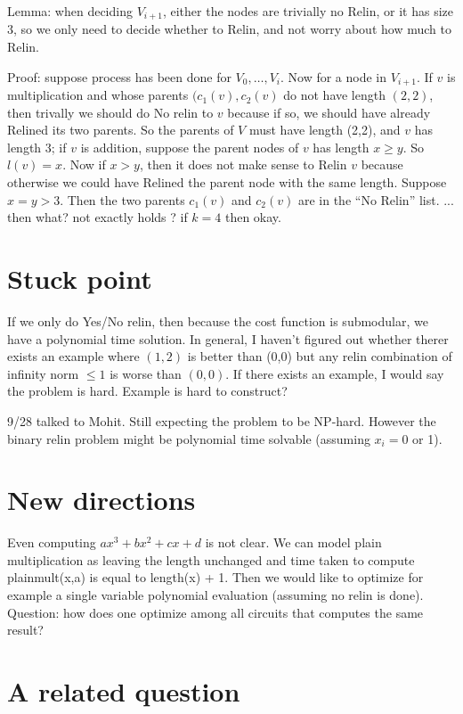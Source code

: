 \documentclass[11pt]{article} %
\theoremstyle{plain}
\theoremstyle{definition}
\begin{document}
Lemma: when deciding $V_{i+1}$, either the nodes are trivially no Relin, or it has size 3, so we only need
to decide whether to Relin, and not worry about how much to Relin.

Proof: suppose process has been done for $V_0, \ldots, V_i$. Now for a node in $V_{i+1}$. If $v$ is 
multiplication and whose parents $(c_1(v), c_2(v)$ do not have length $(2,2)$, then trivally we should do No relin to $v$ because if so, we 
should have already Relined its two parents.  So the parents of $V$ must have length (2,2), and $v$ has 
length 3; if $v$ is addition, suppose the parent nodes of $v$ has length $x \geq y$.  So $l(v) = x$.  Now if 
$x > y$, then it does not make sense to Relin $v$ because otherwise we could have Relined the parent node with the same length. Suppose $x = y > 3$. Then the two parents $c_1(v)$ and $c_2(v)$  are in the 
``No Relin'' list. ... then what? not exactly holds ?  if $k = 4$ then okay. 

\section{Stuck point}

If we only do Yes/No relin, then because the cost function is submodular, we have a polynomial time solution. In general, I haven't figured out whether therer exists an example where $(1,2)$ is better than 
(0,0) but any relin combination of infinity norm $\leq 1$ is worse than $(0,0)$. If there exists an example,
I would say the problem is hard. Example is hard to construct? 

9/28 talked to Mohit. Still expecting the problem to be NP-hard. However the binary relin problem might be 
polynomial time solvable (assuming $x_i = 0$ or 1). 
\fi


\iffalse
\section{New directions}
Even  computing $ax^3 + bx^2 +cx +d$ is not clear. We can model plain multiplication as 
leaving the length unchanged and time taken to compute plainmult(x,a) is equal to length(x) + 1. 
Then we would like to optimize for example a single variable polynomial evaluation (assuming 
no relin is done). Question: how does one optimize among all circuits that computes the same 
result? 

\section{A related question}
\end{document}
